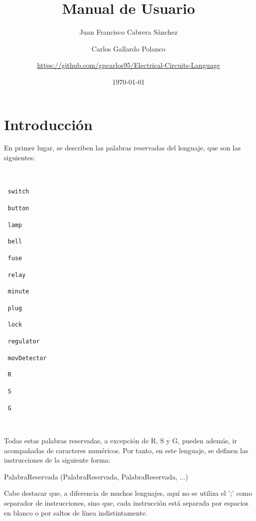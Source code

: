 \documentclass{article}
\author{Juan Francisco Cabrera Sánchez \and Carlos Gallardo Polanco \and \newline \url{https://github.com/gpcarlos95/Electrical-Circuits-Language}}
\title{Manual de Usuario}
\date{\today}
\begin{document}
\maketitle

\section{Introducción}

En primer lugar, se describen las palabras reservadas del lenguaje, que son las siguientes:

\

\begin{enumerate*}
  \item[$\ $]\texttt{switch}
  \item[$\ $]\texttt{button}
  \item[$\ $]\texttt{lamp}
  \item[$\ $]\texttt{bell}
  \item[$\ $]\texttt{fuse}
  \item[$\ $]\texttt{relay}
  \item[$\ $]\texttt{minute}
  \item[$\ $]\texttt{plug}
  \item[$\ $]\texttt{lock}
  \item[$\ $]\texttt{regulator}
  \item[$\ $]\texttt{movDetector}
\end{enumerate*}

\begin{center}
  \begin{enumerate*}
  \item[$\ $]\texttt{R}
  \item[$\ $]\texttt{S}
  \item[$\ $]\texttt{G}
  \end{enumerate*}
\end{center}

\

Todas estas palabras reservadas, a excepción de R, S y G, pueden además, ir acompañadas de caracteres numéricos. Por tanto, en este lenguaje, se definen las instrucciones de la siguiente forma:

\begin{center} PalabraReservada  (PalabraReservada, PalabraReservada, ...) \end{center}

Cabe destacar que, a diferencia de muchos lenguajes, aquí no se utiliza el ';' como separador de instrucciones, sino que, cada instrucción está separada por espacios en blanco o por saltos de línea indistintamente.
\end{document}
